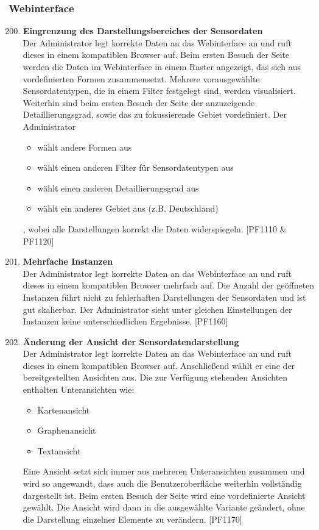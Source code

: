 \subsubsection{Webinterface}
\begin{enumerate}[label=\textbf{TK\arabic{enumi}0}]
	\setcounter{enumi}{199}
	
	\item \textbf{Eingrenzung des Darstellungsbereiches der Sensordaten}\\
	Der Administrator legt korrekte Daten an das Webinterface an und ruft dieses in einem kompatiblen Browser auf. Beim ersten Besuch der Seite werden die Daten im Webinterface in einem Raster angezeigt, das sich aus vordefinierten Formen zusammensetzt. Mehrere vorausgewählte Sensordatentypen, die in einem Filter festgelegt sind, werden visualisiert. Weiterhin sind beim ersten Besuch der Seite der anzuzeigende Detaillierungsgrad, sowie das zu fokussierende Gebiet vordefiniert. Der Administrator
	\begin{itemize}
		\item wählt andere Formen aus
		\item wählt einen anderen Filter für Sensordatentypen aus
		\item wählt einen anderen Detaillierungsgrad aus
		\item wählt ein anderes Gebiet aus (z.B. Deutschland)
	\end{itemize}
	, wobei alle Darstellungen korrekt die Daten widerspiegeln. [PF1110 \& PF1120]
	
	\item \textbf{Mehrfache Instanzen}\\
	Der Administrator legt korrekte Daten an das Webinterface an und ruft dieses in einem kompatiblen Browser mehrfach auf. Die Anzahl der geöffneten Instanzen führt nicht zu fehlerhaften Darstellungen der Sensordaten und ist gut skalierbar. Der Administrator sieht unter gleichen Einstellungen der Instanzen keine unterschiedlichen Ergebnisse. [PF1160]
	
	\item \textbf{Änderung der Ansicht der Sensordatendarstellung}\\
	Der Administrator legt korrekte Daten an das Webinterface an und ruft dieses in einem kompatiblen Browser auf. Anschließend wählt er eine der bereitgestellten Ansichten aus. Die zur Verfügung stehenden Ansichten enthalten Unteransichten wie:
	\begin{itemize}
		\item Kartenansicht
		\item Graphenansicht
		\item Textansicht
	\end{itemize}
	Eine Ansicht setzt sich immer aus mehreren Unteransichten zusammen und wird so angewandt, dass auch die Benutzeroberfläche weiterhin vollständig dargestellt ist. Beim ersten Besuch der Seite wird eine vordefinierte Ansicht gewählt. Die Ansicht wird dann in die ausgewählte Variante geändert, ohne die Darstellung einzelner Elemente zu verändern. [PF1170]
	
\end{enumerate}

